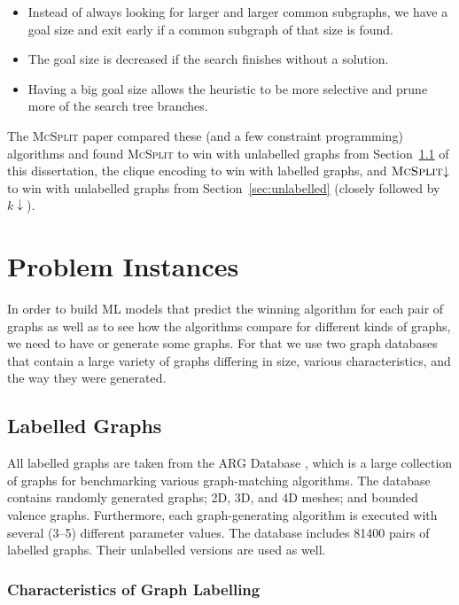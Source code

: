 \documentclass{l4proj}
\theoremstyle{definition}
\theoremstyle{remark}
\begin{document}
\begin{itemize}
\item Instead of always looking for larger and larger common subgraphs, we have
  a goal size and exit early if a common subgraph of that size is found.
\item The goal size is decreased if the search finishes without a solution.
\item Having a big goal size allows the heuristic to be more selective and prune
  more of the search tree branches.
\end{itemize}

The \textsc{McSplit} paper \cite{DBLP:conf/ijcai/McCreeshPT17} compared these
(and a few constraint programming) algorithms and found \textsc{McSplit} to win
with unlabelled graphs from Section~\ref{sec:labelled} of this dissertation, the
clique encoding to win with labelled graphs, and $\textsc{McSplit}{\downarrow}$
to win with unlabelled graphs from Section~\ref{sec:unlabelled} (closely
followed by $k{\downarrow}$).

\chapter{Problem Instances} \label{chapter:problems}

In order to build ML models that predict the winning algorithm for each pair of
graphs as well as to see how the algorithms compare for different kinds of
graphs, we need to have or generate some graphs. For that we use two graph
databases that contain a large variety of graphs differing in size, various
characteristics, and the way they were generated.

\section{Labelled Graphs} \label{sec:labelled}

All labelled graphs are taken from the ARG Database \cite{foggia2001-2,
  DBLP:journals/prl/SantoFSV03}, which is a large collection of graphs for
benchmarking various graph-matching algorithms. The database contains randomly
generated graphs; 2D, 3D, and 4D meshes; and bounded valence graphs.
Furthermore, each graph-generating algorithm is executed with several (3--5)
different parameter values. The database includes \num{81400} pairs of labelled
graphs. Their unlabelled versions are used as well.

\subsection{Characteristics of Graph Labelling} \label{sec:characteristics}
\end{document}
